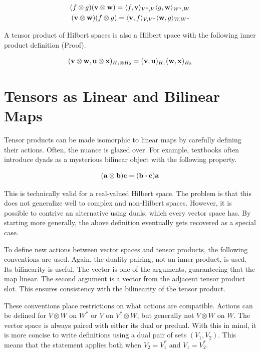 \begin{align}
	(f \otimes g) (\vb{v} \otimes \vb{w}) = \langle f, \vb{v} \rangle_{V^{*}, V} \langle g, \vb{w} \rangle_{W^{*}, W} \\
	(\vb{v} \otimes \vb{w}) (f \otimes g) = \langle \vb{v}, f \rangle_{V, V^{*}} \langle \vb{w}, g \rangle_{W, W^{*}}
\end{align}

A tensor product of Hilbert spaces is also a Hilbert space with the following inner product definition (Proof).

\begin{equation*}
	(\vb{v} \otimes \vb{w}, \vb{u} \otimes \vb{x})_{H_{1} \otimes H_{2}} = (\vb{v}, \vb{u})_{H_{1}} (\vb{w}, \vb{x})_{H_{2}}
\end{equation*}

\section{Tensors as Linear and Bilinear Maps}

Tensor products can be made isomorphic to linear maps by carefully defining their actions. Often, the nuance is glazed over. For example, textbooks often introduce dyads as a mysterious bilinear object with the following property.

\begin{equation*}
	(\vb{a} \otimes \vb{b}) \vb{c} = (\vb{b} \vdot \vb{c}) \vb{a}
\end{equation*}

This is technically valid for a real-valued Hilbert space. The problem is that this does not generalize well to complex and non-Hilbert spaces. However, it is possible to contrive an alternative using duals, which every vector space has. By starting more generally, the above definition eventually gets recovered as a special case.

To define new actions between vector spaces and tensor products, the following conventions are used. Again, the duality pairing, not an inner product, is used. Its bilinearity is useful. The vector is one of the arguments, guaranteeing that the map linear. The second argument is a vector from the adjacent tensor product slot. This ensures consistency with the bilinearity of the tensor product.

These conventions place restrictions on what actions are compatible. Actions can be defined for $V \otimes W$ on $W^{*}$ or $V$ on $V^{*} \otimes W$, but generally not $V \otimes W$ on $W$. The vector space is always paired with either its dual or predual. With this in mind, it is more concise to write definitions using a dual pair of sets $(V_{1}, V_{2})$. This means that the statement applies both when $V_{2} = V_{1}^{*}$ and $V_{1} = V_{2}^{*}$.

